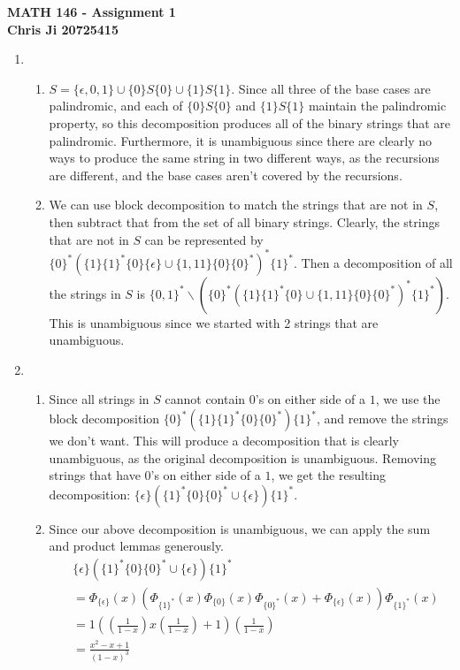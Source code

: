 \documentclass[10pt,english]{article}
\begin{document}
\noindent \begin{center}
\textbf{\large{}MATH 146 - Assignment 1}\\
\textbf{\large{}Chris Ji 20725415}
\par\end{center}{\large \par}
\medskip{}

\begin{enumerate}
\item \begin{enumerate}
    \item $S=\{\epsilon,0,1\}\cup \{0\}S\{0\}\cup \{1\}S\{1\}$. Since all three of the base cases are palindromic, and each of $\{0\}S\{0\}$ and $\{1\}S\{1\}$ maintain the palindromic property, so this decomposition produces all of the binary strings that are palindromic. Furthermore, it is unambiguous since there are clearly no ways to produce the same string in two different ways, as the recursions are different, and the base cases aren't covered by the recursions. 
    
    \item We can use block decomposition to match the strings that are not in $S$, then subtract that from the set of all binary strings. Clearly, the strings that are not in $S$ can be represented by $\{0\}^*(\{1\}\{1\}^*\{0\}\{\epsilon\}\cup\{1,11\}\{0\}\{0\}^*)^*\{1\}^*$. Then a decomposition of all the strings in $S$ is $\{0,1\}^*\backslash(\{0\}^*(\{1\}\{1\}^*\{0\}\cup\{1,11\}\{0\}\{0\}^*)^*\{1\}^*)$. This is unambiguous since we started with 2 strings that are unambiguous. 
    
\end{enumerate}

\pagebreak
\item \begin{enumerate}
    \item Since all strings in $S$ cannot contain 0's on either side of a $1$, we use the block decomposition $\{0\}^*(\{1\}\{1\}^*\{0\}\{0\}^*)\{1\}^*$, and remove the strings we don't want. This will produce a decomposition that is clearly unambiguous, as the original decomposition is unambiguous. Removing strings that have $0$'s on either side of a $1$, we get the resulting decomposition: $\{\epsilon\}(\{1\}^*\{0\}\{0\}^*\cup\{\epsilon\})\{1\}^*$.
    \item Since our above decomposition is unambiguous, we can apply the sum and product lemmas generously. \begin{align*}&\{\epsilon\}(\{1\}^*\{0\}\{0\}^*\cup\{\epsilon\})\{1\}^*\\&=\Phi_{\{\epsilon\}}(x)(\Phi_{\{1\}^*}(x)\Phi_{\{0\}}(x)\Phi_{\{0\}^*}(x)+\Phi_{\{\epsilon\}}(x))\Phi_{\{1\}^*}(x)\\&=1\left(\left(\frac{1}{1-x}\right)x\left(\frac{1}{1-x}\right)+1\right)\left(\frac{1}{1-x}\right)\\&=\frac{x^2-x+1}{(1-x)^3}\end{align*}
\end{enumerate}


\end{enumerate}
\end{document}
